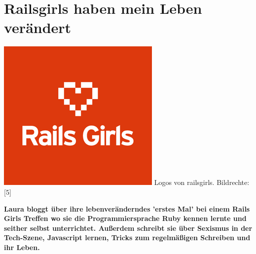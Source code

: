 \section*{Railsgirls haben mein Leben verändert}
\hypertarget{laura}{}
\label{laura}

\begin{center}
\includegraphics[width=\linewidth]{laura/laura-railsgirls.png}
\footnotesize{Logos von railsgirls. Bildrechte: [5]}
\end{center}

\textbf{Laura bloggt über ihre lebenveränderndes 'erstes Mal' bei einem Rails Girls Treffen wo sie die Programmiersprache Ruby kennen lernte und seither selbst unterrichtet. Außerdem schreibt sie über Sexismus in der Tech-Szene, Javascript lernen, Tricks zum regelmäßigen Schreiben und ihr Leben.} \\

